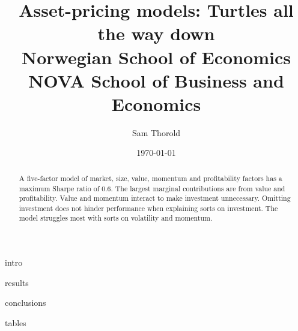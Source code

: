 \documentclass[a4paper, 12pt]{article}
\title{
  {Asset-pricing models: Turtles all the way down}\\
  {\large Norwegian School of Economics}\\
  {\large NOVA School of Business and Economics}
}
\author{Sam Thorold}
\date{\today}
\begin{document}
\maketitle

\begin{abstract}
  A five-factor model of
  market, size, value, momentum and profitability factors
  has a maximum Sharpe ratio of 0.6.
  The largest marginal contributions are from value and profitability.
  Value and momentum interact to make investment unnecessary.
  Omitting investment does not hinder performance when explaining sorts on investment.
  The model struggles most with sorts on volatility and momentum.
\end{abstract}

{intro}




{results}

{conclusions}

\printbibliography

\appendix

{tables}



\end{document}
